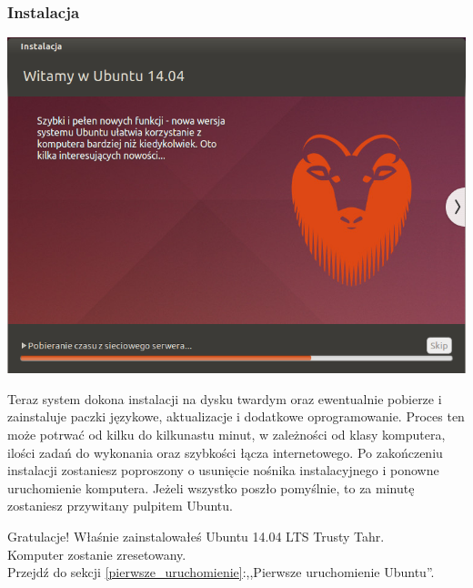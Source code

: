 \subsubsection{Instalacja}
\begin{center}
        \includegraphics[width=\linewidth]{images/instalator_kopiowanie.png}
\end{center}

Teraz system dokona instalacji na dysku twardym oraz ewentualnie pobierze i zainstaluje paczki językowe, aktualizacje i dodatkowe oprogramowanie. Proces ten może potrwać od kilku do kilkunastu minut, w zależności od klasy komputera, ilości zadań do wykonania oraz szybkości łącza internetowego. Po zakończeniu instalacji zostaniesz poproszony o usunięcie nośnika instalacyjnego i ponowne uruchomienie komputera. Jeżeli wszystko poszło pomyślnie, to za minutę zostaniesz przywitany pulpitem Ubuntu.
\begin{flushright}
\textcolor{ubuntu_orange}{Gratulacje!} Właśnie zainstalowałeś Ubuntu 14.04 LTS Trusty Tahr.\\
Komputer zostanie zresetowany.\\
Przejdź do sekcji \ref{pierwsze_uruchomienie}:,,Pierwsze uruchomienie Ubuntu''.
\end{flushright}
\clearpage
